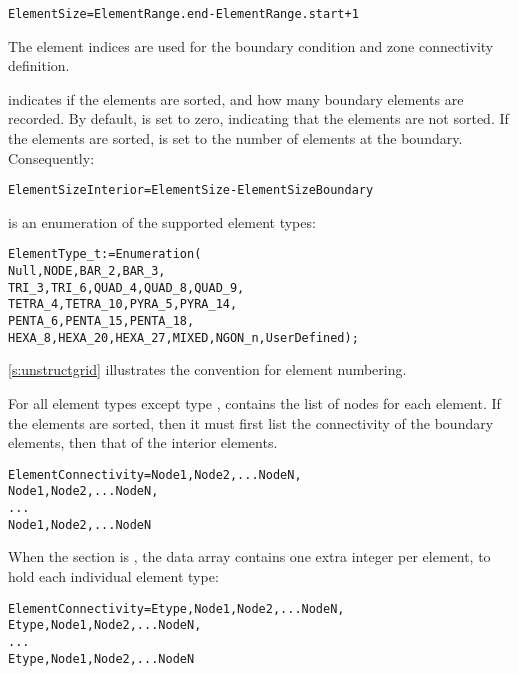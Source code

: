 \begin{alltt}
  ElementSize = ElementRange.end - ElementRange.start + 1
\end{alltt}

The element indices are used for the boundary condition and zone
connectivity definition.

 indicates if the elements are sorted, and
how many boundary elements are recorded.
By default,  is set to zero, indicating that
the elements are not sorted.
If the elements are sorted,  is set to the
number of elements at the boundary.
Consequently:

\begin{alltt}
  ElementSizeInterior = ElementSize - ElementSizeBoundary
\end{alltt}

 is an enumeration of the supported element types:

\begin{alltt}
  ElementType\_t := Enumeration(
     Null, NODE, BAR\_2, BAR\_3,
     TRI\_3, TRI\_6, QUAD\_4, QUAD\_8, QUAD\_9,
     TETRA\_4, TETRA\_10, PYRA\_5, PYRA\_14,
     PENTA\_6, PENTA\_15, PENTA\_18, 
     HEXA\_8, HEXA\_20, HEXA\_27, MIXED, NGON\_n, UserDefined );
\end{alltt}
\autoref{s:unstructgrid} illustrates the convention for element numbering.

For all element types except type , 
contains the list of nodes for each element.
If the elements are sorted, then it must first list the connectivity of
the boundary elements, then that of the interior elements.

\begin{alltt}
  ElementConnectivity = Node1, Node2, ... NodeN,
                        Node1, Node2, ... NodeN,
                        ...
                        Node1, Node2, ... NodeN
\end{alltt}

When the section  is , the data array
 contains one extra integer per element,
to hold each individual element type:

\begin{alltt}
  ElementConnectivity = Etype, Node1, Node2, ... NodeN,
                        Etype, Node1, Node2, ... NodeN,
                        ...
                        Etype, Node1, Node2, ... NodeN
\end{alltt}

